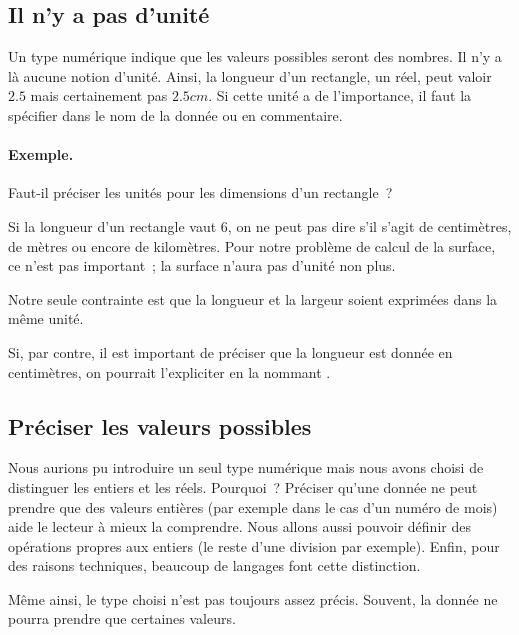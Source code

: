 		\subsection{Il n’y a pas d’unité}
	
			Un type numérique indique que les valeurs possibles seront
			des nombres. Il n’y a là aucune notion d’unité.
			Ainsi, la longueur d’un rectangle, un réel, 
			peut valoir $2.5$ mais certainement pas $2.5 cm$.
			Si cette unité a de l’importance,
			il faut la spécifier dans le nom de la donnée ou en commentaire.
			
			\begin{Emphase}
				\paragraph{Exemple.}
				Faut-il préciser les unités 
				pour les dimensions d’un rectangle~?
				
				Si la longueur d’un rectangle vaut $6$, 
				on ne peut pas dire s’il s’agit de centimètres, 
				de mètres ou encore de kilomètres.
				Pour notre problème de calcul de la surface,
				ce n’est pas important~;
				la surface n’aura pas d’unité non plus.

				Notre seule contrainte est que la longueur et la largeur soient
				exprimées dans la même unité.
				
				Si, par contre, 
				il est important de préciser que la longueur
				est donnée en centimètres,
				on pourrait l’expliciter en la nommant
				.	
			\end{Emphase}
	
		\subsection{Préciser les valeurs possibles}
		
			Nous aurions pu introduire un seul type numérique
			mais nous avons choisi de distinguer les entiers et les réels.
			Pourquoi~?
			Préciser qu’une donnée ne peut prendre que des valeurs entières
			(par exemple dans le cas d’un numéro de mois)
			aide le lecteur à mieux la comprendre.
			Nous allons aussi pouvoir définir des opérations propres aux entiers
			(le reste d’une division par exemple).
			Enfin, pour des raisons techniques,
			beaucoup de langages font cette distinction.
			
			Même ainsi, le type choisi n’est pas toujours assez précis.
			Souvent, la donnée ne pourra prendre que certaines valeurs.
			
